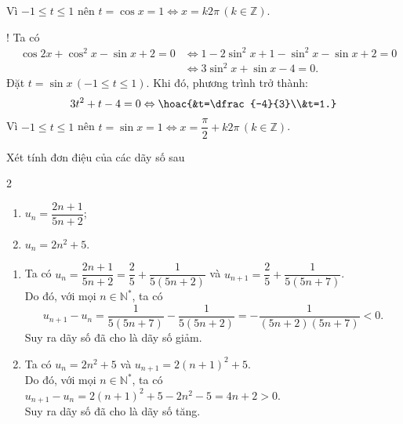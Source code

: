 \begin{bt}
{\begin{listEX}[2]
$$			$$
			Vì $-1\le t\le 1$ nên $t=\cos{x}=1\Leftrightarrow x=k2\pi\,(k\in\mathbb{Z})$.
			\item! Ta có
			\begin{eqnarray*}
				& \cos{2x}+\cos^2{x}-\sin{x}+2=0 & \Leftrightarrow 1-2\sin^2{x}+1-\sin^2{x}-\sin{x}+2=0\\
				& & \Leftrightarrow 3\sin^2{x}+\sin{x}-4=0.
			\end{eqnarray*}
			Đặt $t=\sin{x}\,(-1\le t\le 1)$. Khi đó, phương trình trở thành:
			$$
			3t^2+t-4=0 \Leftrightarrow \hoac{&t=\dfrac{-4}{3}\\&t=1.}
			$$
			Vì $-1\le t\le 1$ nên $t=\sin{x}=1\Leftrightarrow x=\dfrac{\pi}{2}+k2\pi\,(k\in\mathbb{Z})$.
		\end{listEX}
	}
\end{bt}

\begin{bt}%
	Xét tính đơn điệu của các dãy số sau
	\begin{multicols}{2}
		\begin{enumerate}
			\item $u_n=\dfrac{2n+1}{5n+2}$;
			\item $u_n=2n^2+5$.
		\end{enumerate}
	\end{multicols}
	\loigiai 
	{
		\begin{enumerate}
			\item Ta có $u_n=\dfrac{2n+1}{5n+2}=\dfrac{2}{5}+\dfrac{1}{5(5n+2)}$ và $u_{n+1}=\dfrac{2}{5}+\dfrac{1}{5(5n+7)}$.\\
			Do đó, với mọi $n\in \mathbb{N}^*$, ta có $$u_{n+1}-u_n=\dfrac{1}{5(5n+7)}-\dfrac{1}{5(5n+2)}=-\dfrac{1}{(5n+2)(5n+7)}<0.$$
			Suy ra dãy số đã cho là dãy số giảm.
			\item Ta có $u_n=2n^2+5$ và $u_{n+1}=2(n+1)^2+5$.\\
			Do đó, với mọi $n\in \mathbb{N}^*$, ta có $u_{n+1}-u_n=2(n+1)^2+5-2n^2-5=4n+2>0$.\\
			Suy ra dãy số đã cho là dãy số tăng.
		\end{enumerate}
	}
\end{bt}

